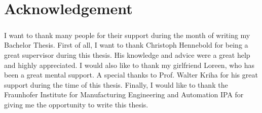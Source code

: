 \chapter*{Acknowledgement}
%
\paragraph{}
I want to thank many people for their support during the month of writing my Bachelor Thesis.
First of all, I want to thank Christoph Hennebold for being a great supervisor during this thesis. His knowledge and advice were a great help and highly appreciated.
I would also like to thank my girlfriend Loreen, who has been a great mental support. 
A special thanks to Prof. Walter Kriha for his great support during the time of this thesis.
Finally, I would like to thank the Fraunhofer Institute for Manufacturing Engineering and Automation IPA for giving me the opportunity to write this thesis.

